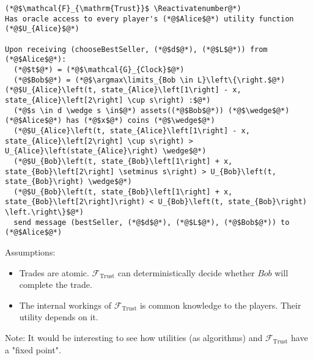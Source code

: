 \Suppressnumber
\begin{lstlisting}[label=trustfunc, style=numbers]
(*@$\mathcal{F}_{\mathrm{Trust}}$ \Reactivatenumber@*)
Has oracle access to every player's (*@$Alice$@*) utility function (*@$U_{Alice}$@*)

Upon receiving (chooseBestSeller, (*@$d$@*), (*@$L$@*)) from (*@$Alice$@*):
  (*@$t$@*) = (*@$\mathcal{G}_{Clock}$@*)
  (*@$Bob$@*) = (*@$\argmax\limits_{Bob \in L}\left\{\right.$@*) (*@$U_{Alice}\left(t, state_{Alice}\left[1\right] - x, state_{Alice}\left[2\right] \cup s\right) :$@*)
  (*@$s \in d \wedge s \in$@*) assets((*@$Bob$@*)) (*@$\wedge$@*) (*@$Alice$@*) has (*@$x$@*) coins (*@$\wedge$@*)
  (*@$U_{Alice}\left(t, state_{Alice}\left[1\right] - x, state_{Alice}\left[2\right] \cup s\right) > U_{Alice}\left(state_{Alice}\right) \wedge$@*)
  (*@$U_{Bob}\left(t, state_{Bob}\left[1\right] + x, state_{Bob}\left[2\right] \setminus s\right) > U_{Bob}\left(t, state_{Bob}\right) \wedge$@*)
  (*@$U_{Bob}\left(t, state_{Bob}\left[1\right] + x, state_{Bob}\left[2\right]\right) < U_{Bob}\left(t, state_{Bob}\right) \left.\right\}$@*)
  send message (bestSeller, (*@$d$@*), (*@$L$@*), (*@$Bob$@*)) to (*@$Alice$@*)
\end{lstlisting}

Assumptions:
\begin{itemize}
  \item Trades are atomic. $\mathcal{F}_{\mathrm{Trust}}$ can deterministically decide whether
  $Bob$ will complete the trade.
  \item The internal workings of $\mathcal{F}_{\mathrm{Trust}}$ is common knowledge to the players.
  Their utility depends on it.
\end{itemize}
Note: It would be interesting to see how utilities (as algorithms) and
$\mathcal{F}_{\mathrm{Trust}}$ have a "fixed point".
